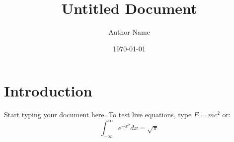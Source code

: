 \documentclass{article}
\title{Untitled Document}
\author{Author Name}
\date{\today}
\begin{document}
\maketitle

\section{Introduction}
Start typing your document here. To test live equations, type $E = mc^2$ or:
\begin{equation}
  \int_{-\infty}^{\infty} e^{-x^2} dx = \sqrt{\pi}
\end{equation}
\end{document}
